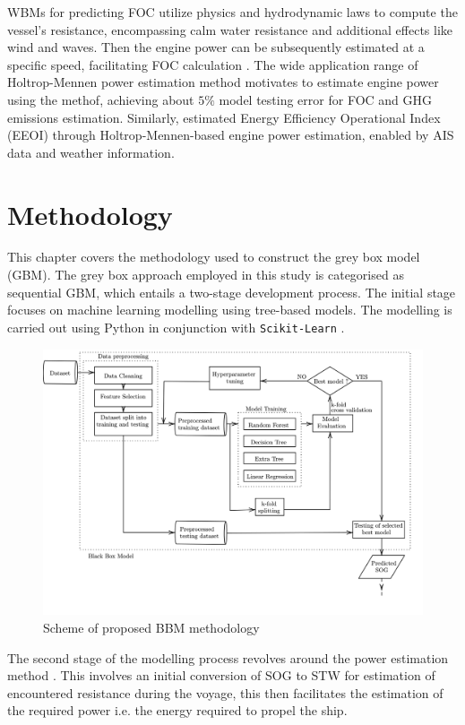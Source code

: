\documentclass[]{interact}
\theoremstyle{plain}%
\theoremstyle{definition}
\theoremstyle{remark}
\begin{document}
WBMs for predicting FOC utilize physics and hydrodynamic laws to compute the vessel's resistance, encompassing calm water resistance and additional effects like wind and waves. Then the engine power can be subsequently estimated at a specific speed, facilitating FOC calculation \citep{haranen2016white}. The wide application range of Holtrop-Mennen power estimation method \citet{Holtrop.1984} motivates \citet{Rakke.2016} to estimate engine power using the methof, achieving about $5\%$ model testing error for FOC and GHG emissions estimation. Similarly, \citet{Kim.2020b} estimated Energy Efficiency Operational Index (EEOI) through Holtrop-Mennen-based engine power estimation, enabled by AIS data and weather information.

\section{Methodology}\label{sec:big_methodology}

This chapter covers the methodology used to construct the grey box model (GBM). The grey box approach employed in this study is categorised as sequential GBM, which entails a two-stage development process. The initial stage focuses on machine learning modelling using tree-based models. The modelling is carried out using Python in conjunction with \texttt{Scikit-Learn} \citep{FabianPedregosa.2011}. 
\begin{figure}
  \centering
      \includegraphics[width=.75\textwidth]{00_figures/flowmethod_BBM_alt.png}
      \caption{Scheme of proposed BBM methodology}
      \label{fig:flowchart_BBM}
\end{figure}

The second stage of the modelling process revolves around the power estimation method \citep{Holtrop.1984}. This involves an initial conversion of SOG to STW for estimation of encountered resistance during the voyage, this then facilitates the estimation of the required power i.e. the energy required to propel the ship.
\end{document}
